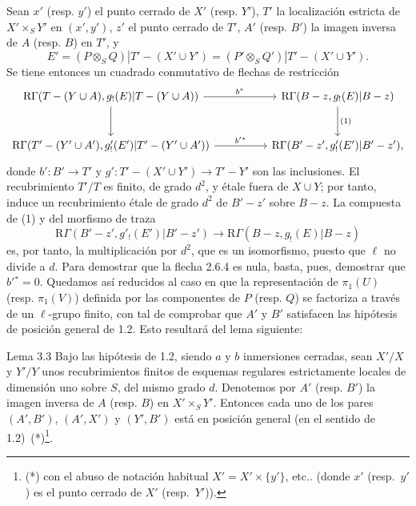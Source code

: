 Sean $x'$ (resp. $y'$) el punto cerrado de $X'$ (resp. $Y'$), $T'$ la localización estricta de $X'\times_S Y'$ en $(x',y')$, $z'$ el punto cerrado de $T'$, $A'$ (resp. $B'$) la imagen inversa de $A$ (resp. $B$) en $T'$, y
\[
E'=(P\otimes_S Q)|T'-(X'\cup Y')
   =(P'\otimes_S Q')|T'-(X'\cup Y').
\]
Se tiene entonces un cuadrado conmutativo de flechas de restricción
\[
\begin{tikzcd}[column sep=huge,row sep=large]
\mathrm R\Gamma(T-(Y\cup A),g_!(E)|T-(Y\cup A))
 \arrow[r,"b^*"] \arrow[d]
&
\mathrm R\Gamma(B-z,g_!(E)|B-z) \arrow[d,"(1)"]\\
\mathrm R\Gamma(T'-(Y'\cup A'),g'_!(E')|T'-(Y'\cup A'))
 \arrow[r,"b'{}^*"]
&
\mathrm R\Gamma(B'-z',g'_!(E')|B'-z') ,
\end{tikzcd}
\]
donde $b':B'\to T'$ y $g':T'-(X'\cup Y')\to T'-Y'$ son las inclusiones. El recubrimiento $T'/T$ es finito, de grado $d^2$, y étale fuera de $X\cup Y$; por tanto, induce un recubrimiento étale de grado $d^2$ de $B'-z'$ sobre $B-z$. La compuesta de (1) y del morfismo de traza
\[
\mathrm R\Gamma(B'-z',g'_!(E')|B'-z')
 \longrightarrow
\mathrm R\Gamma(B-z,g_!(E)|B-z)
\]
es, por tanto, la multiplicación por $d^2$, que es un isomorfismo, puesto que $\ell$ no divide a $d$. Para demostrar que la flecha 2.6.4 es nula, basta, pues, demostrar que $b'{}^*=0$. Quedamos así reducidos al caso en que la representación de $\pi_1(U)$ (resp. $\pi_1(V)$) definida por las componentes de $P$ (resp. $Q$) se factoriza a través de un $\ell$-grupo finito, con tal de comprobar que $A'$ y $B'$ satisfacen las hipótesis de posición general de 1.2. Esto resultará del lema siguiente:

\begin{statement}{Lema 3.3}
Bajo las hipótesis de 1.2, siendo $a$ y $b$ inmersiones cerradas, sean $X'/X$ y $Y'/Y$ unos recubrimientos finitos de esquemas regulares estrictamente locales de dimensión uno sobre $S$, del mismo grado $d$. Denotemos por $A'$ (resp. $B'$) la imagen inversa de $A$ (resp. $B$) en $X'\times_S Y'$. Entonces cada uno de los pares $(A',B')$, $(A',X')$ y $(Y',B')$ está en posición general (en el sentido de 1.2)~(*)\footnote{(*) con el abuso de notación habitual $X'=X'\times\{y'\}$, etc.. (donde $x'$ (resp.\ $y'$) es el punto cerrado de $X'$ (resp.\ $Y'$)).}.
\end{statement}
